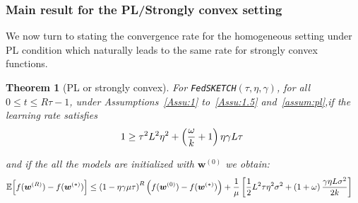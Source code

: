 \documentclass[11pt]{article}
\newtheorem{theorem}{Theorem}
\begin{document}
\subsubsection{Main result for the PL/Strongly convex setting}
 
We now turn to stating the convergence rate for the homogeneous setting under PL condition which naturally leads to the same rate for strongly convex functions.
\begin{theorem}[PL or strongly convex]\label{thm:pl-iid}
For \texttt{FedSKETCH}$(\tau, \eta, \gamma)$, for all $0\leq t\leq R\tau-1$,  under Assumptions~\ref{Assu:1} to~\ref{Assu:1.5} and~\ref{assum:pl},if the learning rate satisfies 
\begin{align}\notag
   1\geq {\tau^2 L^2\eta^2}+\left(\frac{\omega}{k}+1\right){\eta\gamma L}{\tau}  \
\end{align}

and if the all the models are initialized with $\boldsymbol{w}^{(0)}$ we obtain:
\begin{align}\notag
        \mathbb{E}\Big[f({\boldsymbol{w}}^{(R)})-f({\boldsymbol{w}}^{(*)})\Big]&\leq \left(1-\eta\gamma{\mu\tau}\right)^R\left(f(\boldsymbol{w}^{(0)})-f(\boldsymbol{w}^{(*)})\right)+\frac{1}{{\mu}}\left[\frac{1}{2} L^2\tau\eta^2\sigma^2+\left(1+\omega\right)\frac{\gamma\eta L\sigma^2}{2k}\right]
\end{align}
\end{theorem}
\end{document}

